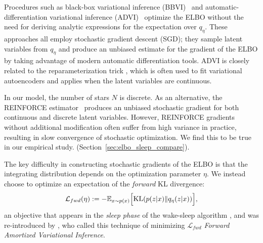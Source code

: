 
Procedures such as black-box variational inference (BBVI)~\citep{ranganath2013black} and
automatic-differentiation variational inference (ADVI)~\citep{kucukelbir2016automatic}
optimize the ELBO  without the need for
deriving analytic expressions for the expectation over $q_\eta$.
These approaches all employ stochastic gradient descent (SGD);
they sample latent variables from $q_\eta$ and produce an unbiased estimate for the gradient of the ELBO by taking advantage of modern automatic differentiation tools.
ADVI is closely related to the reparameterization trick \citep{kingma2013autoencoding, rezende2014stochastic}, which is often used to fit variational autoencoders and applies when the latent variables are continuous.

In our model, the number of stars $N$ is discrete.
As an alternative, the REINFORCE estimator~\citep{Williams1992reinforce} produces an unbiased stochastic gradient for both continuous and discrete latent variables.
However, REINFORCE gradients without additional modification often suffer from high variance in practice, resulting in slow convergence of stochastic optimization. We find this to be true in our empirical study.  (Section~\ref{sec:elbo_sleep_compare}).

The key difficulty in constructing stochastic gradients of the ELBO is that the
integrating distribution depends on the optimization parameter $\eta$.
We instead choose to optimize an expectation of the \textit{forward} KL divergence:
\begin{align}
    \mathcal{L}_{fwd}(\eta) :=
    - \mathbb{E}_{x \sim p(x)}\Big[\textrm{KL}(p(z | x) \| q_\eta(z | x))\Big]
    \label{eq:sleep_obj},
\end{align}
an objective that appears in the \textit{sleep phase} of the wake-sleep algorithm
\citep{Hinton1995wake_sleep, bornschein2014reweighted,le2020revisiting},
and was re-introduced by \cite{ambrogioni2019favi}, who called this technique
of minimizing $\mathcal{L}_{fwd}$ \textit{Forward Amortized Variational Inference}.

